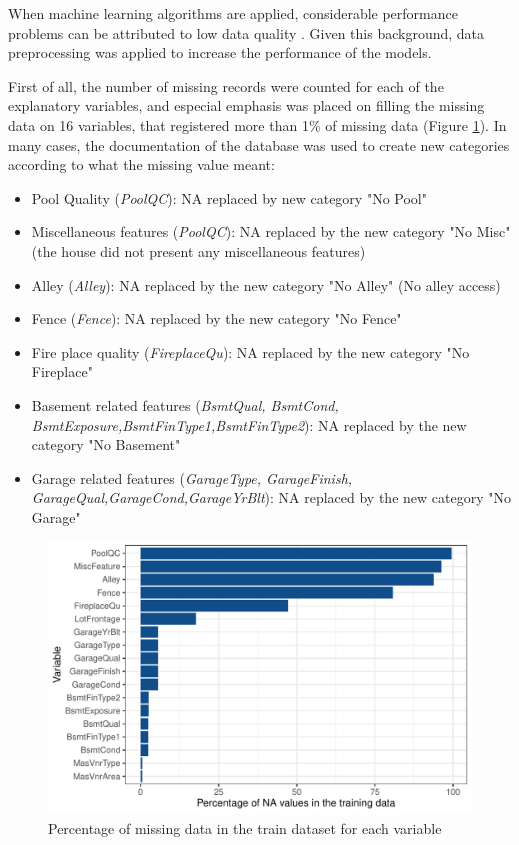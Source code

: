 \documentclass[11pt,onecolumn,titlepage,letterpaper]{article}
\begin{document}
When machine learning algorithms are applied, considerable performance problems can be attributed to low data quality \cite{Installe2014}. Given this background, data preprocessing was applied to increase the performance of the models.

First of all, the number of missing records were counted for each of the explanatory variables, and especial emphasis was placed on filling the missing data on 16 variables, that registered more than 1\% of missing data (Figure \ref{fig:na}). In many cases, the documentation of the database was used to create new categories according to what the missing value meant:

\begin{itemize}
	\item Pool Quality (\textit{PoolQC}): NA replaced by new category "No Pool"
	\item Miscellaneous features (\textit{PoolQC}): NA replaced by the new category "No Misc" (the house did not present any miscellaneous features)
	\item Alley (\textit{Alley}): NA replaced by the new category "No Alley" (No alley access)
	\item Fence (\textit{Fence}): NA replaced by the new category "No Fence"
	\item Fire place quality (\textit{FireplaceQu}): NA replaced by the new category "No Fireplace"
	\item Basement related features (\textit{BsmtQual, BsmtCond, BsmtExposure,BsmtFinType1,BsmtFinType2}): NA replaced by the new category "No Basement"
	\item Garage related features (\textit{GarageType, GarageFinish, GarageQual,GarageCond,GarageYrBlt}): NA replaced by the new category "No Garage"
\end{itemize}

\begin{figure}[H]
	\begin{center}
		\includegraphics[width=0.8\linewidth]{NA_plot.pdf}
	\end{center}
	\caption{Percentage of missing data in the train dataset for each variable}
	\label{fig:na}
\end{figure}
\end{document}
